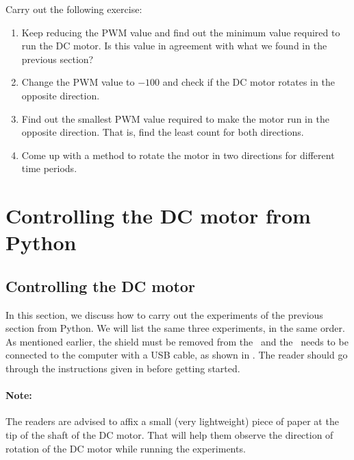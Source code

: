 \begin{exercise} 
  Carry out the following exercise:
  \begin{enumerate}
    \item Keep reducing the PWM value and find out the minimum value
          required to run the DC motor.  Is this value in agreement with what
          we found in the previous section?
    \item Change the PWM value to $-100$ and check if the DC motor rotates
          in the opposite direction.
    \item Find out the smallest PWM value required to make the motor run
          in the opposite direction.  That is, find the least count for both
          directions.
    \item Come up with a method to rotate the motor in two directions for
          different time periods.
  \end{enumerate}
\end{exercise}

\section{Controlling the DC motor from Python}
\subsection{Controlling the DC motor}
In this section, we discuss how to carry out the experiments of the
previous section from Python.  We will list the same three experiments,
in the same order. As mentioned earlier, the shield must be removed from 
the \arduino\ and the \arduino\ needs to be connected to the computer 
with a USB cable, as shown in . The reader should go through the instructions given in
 before getting started.

\paragraph{Note:} The readers are advised to affix a small 
(very lightweight) piece of paper at the tip of the shaft of the DC motor. 
That will help them observe the direction of rotation 
of the DC motor while running the experiments. 

